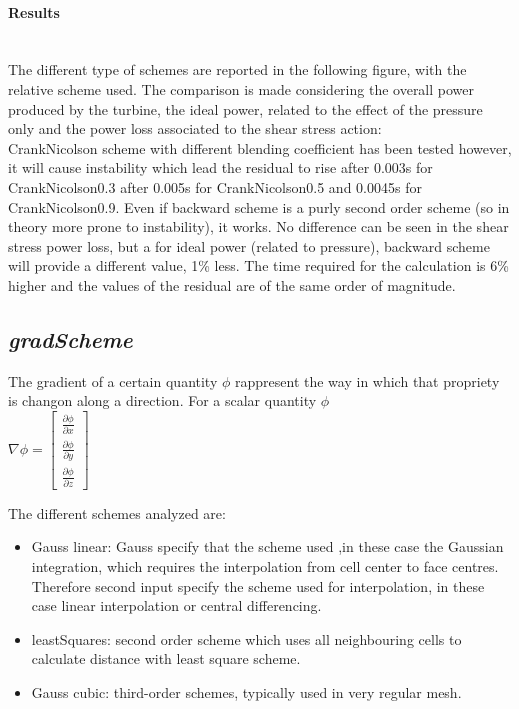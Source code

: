 \documentclass[a4paper,12pt]{article}
\begin{document}
\paragraph{Results} \mbox{}\\
The different type of schemes are reported in the following figure, with the relative scheme used. The comparison is made considering the overall power produced by the turbine, the ideal power, related to the effect of the pressure only and the power loss associated to the shear stress action:
\\ CrankNicolson scheme with different blending coefficient has been tested however, it will cause instability which lead the residual to rise after 0.003s for CrankNicolson0.3 after 0.005s for CrankNicolson0.5 and 0.0045s for CrankNicolson0.9.
Even if backward scheme is a purly second order scheme (so in theory more prone to instability), it works.
No difference can be seen in the shear stress power loss, but a for ideal power (related to pressure), backward scheme will provide a different value, 1\% less. The time required for the calculation is 6\% higher and the values of the residual are of the same order of magnitude.



\subsection{\textit{gradScheme}}
The gradient of a certain quantity $\phi$ rappresent the way in which that propriety is changon along a direction. For a scalar quantity $\phi$
\\ $\nabla \phi = \begin{bmatrix} \frac{\partial \phi}{\partial x} \\ \frac{\partial \phi}{\partial y} \\\frac{\partial \phi}{\partial z}\end{bmatrix} $

The different schemes analyzed are:
\begin{itemize} 
 \item {\ttfamily Gauss linear}: Gauss specify that the scheme used ,in these case the Gaussian integration, which requires the interpolation from cell center to face centres. Therefore second input specify the scheme used for interpolation, in these case linear interpolation or central differencing.
 
 \item {\ttfamily leastSquares}: second order scheme which uses all neighbouring cells to calculate distance with least square scheme.
 
 \item {\ttfamily Gauss cubic}: third-order schemes, typically used in very regular mesh.
 \end{itemize} 
\end{document}
